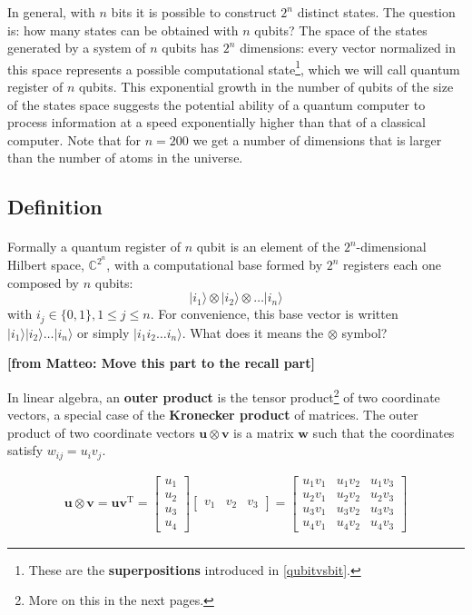 \documentclass[a4paper,10pt]{article}
\newcommand{\from}[2]{{\bf[{\sc from #1:} #2]}}
\begin{document}
In general, with $n$ bits it is possible to construct $2^n$ distinct states. The question is: how many states can be obtained with $n$ qubits? The space of the states generated by a system of $n$ qubits has $2^n$ dimensions: every vector normalized in this space represents a possible computational state\footnote{These are the \textbf{superpositions} introduced in \autoref{qubitvsbit}.}, which we will call quantum register of $n$ qubits. This exponential growth in the number of qubits of the size of the states space suggests the potential ability of a quantum computer to process information at a speed exponentially higher than that of a classical computer. Note that for $n = 200$ we get a number of dimensions that is larger than the number of atoms in the universe. 

\subsection{Definition}

\paragraph{} Formally a quantum register of $n$ qubit is an element of the $2^n$-dimensional Hilbert space, ${\mathbb{C}}^{2^n}$, with a computational base formed by $2^n$ registers each one composed by $n$ qubits:
$$|i_1\rangle\otimes|i_2\rangle\otimes\ldots|i_n\rangle$$
with $i_j \in \{0, 1\}, 1 \leq j \leq n$. For convenience, this base vector is written $|i_1\rangle|i_2\rangle\ldots|i_n\rangle$ or simply $|i_1 i_2\ldots i_n\rangle$. What does it means the $\otimes$ symbol?

\from{Matteo}{Move this part to the recall part}

In linear algebra, an \textbf{outer product} is the tensor product\footnote{More on this in the next pages.} of two coordinate vectors, a special case of the \textbf{Kronecker product} of matrices. The outer product of two coordinate vectors $\mathbf{u} \otimes \mathbf{v}$ is a matrix $\mathbf{w}$ such that the coordinates satisfy $w_{ij} = u_{i} v_{j}$.

\begin{equation*}
\begin{aligned}
\mathbf{u} \otimes \mathbf{v} = \mathbf{u} \mathbf{v}^{\mathrm{T}} = {\begin{bmatrix}
u_{1} \\
u_{2} \\
u_{3} \\
u_{4}
\end{bmatrix}}
{\begin{bmatrix}
v_{1} & v_{2} & v_{3}
\end{bmatrix}} = 
{\begin{bmatrix}
u_{1} v_{1} & u_{1} v_{2} & u_{1} v_{3} \\
u_{2} v_{1} & u_{2} v_{2} & u_{2} v_{3} \\ 
u_{3} v_{1} & u_{3} v_{2} & u_{3} v_{3} \\ 
u_{4} v_{1} & u_{4} v_{2} & u_{4} v_{3}
\end{bmatrix}}
\end{aligned}
\end{equation*}
\end{document}

